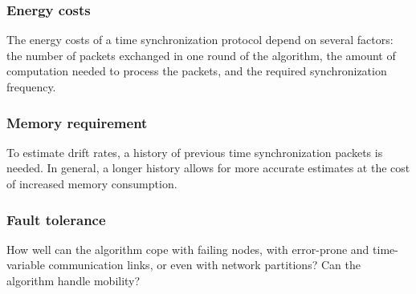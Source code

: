 \documentclass[a4paper,10pt]{report}
\begin{document}
\subsubsection{\textbf{Energy costs}}
The energy costs of a time synchronization protocol depend on several factors: the number of packets exchanged in one round of the algorithm, the amount of computation needed to process the packets, and the required synchronization frequency.
\subsubsection{\textbf{Memory requirement}}
To estimate drift rates, a history of previous time synchronization packets is needed. In general, a longer history allows for more accurate estimates at the cost of increased memory consumption.
\subsubsection{\textbf{Fault tolerance}}
How well can the algorithm cope with failing nodes, with error-prone and time-variable communication links, or even with network partitions? Can the algorithm handle mobility?
\end{document}
